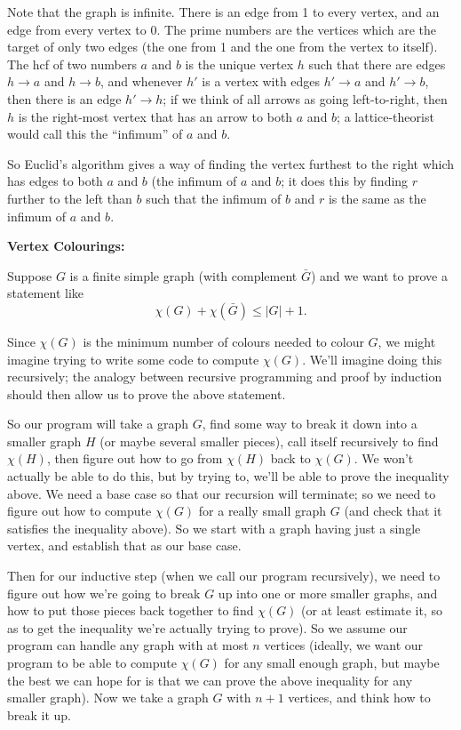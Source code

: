 \documentclass{article}
\begin{document}
Note that the graph is infinite. There is an edge from 1 to every vertex, and an edge from every vertex to 0. The prime numbers are the vertices which are the target of only two edges (the one from 1 and the one from the vertex to itself). The hcf of two numbers $a$ and $b$ is the unique vertex $h$ such that there are edges $h\to a$ and $h\to b$, and whenever $h'$ is a vertex with edges $h'\to a$ and $h'\to b$, then there is an edge $h'\to h$; if we think of all arrows as going left-to-right, then $h$ is the right-most vertex that has an arrow to both $a$ and $b$; a lattice-theorist would call this the ``infimum'' of $a$ and $b$.

So Euclid's algorithm gives a way of finding the vertex furthest to the right which has edges to both $a$ and $b$ (the infimum of $a$ and $b$; it does this by finding $r$ further to the left than $b$ such that the infimum of $b$ and $r$ is the same as the infimum of $a$ and $b$.

\clearpage




\textbf{Vertex Colourings:}\bigskip


Suppose $G$ is a finite simple graph (with complement $\bar{G}$) and we want to prove a statement like
\[\chi(G)+\chi(\bar{G})\leq |G|+1.\]

Since $\chi(G)$ is the minimum number of colours needed to colour $G$, we might imagine trying to write some code to compute $\chi(G)$. We'll imagine doing this recursively; the analogy between recursive programming and proof by induction should then allow us to prove the above statement.

So our program will take a graph $G$, find some way to break it down into a smaller graph $H$ (or maybe several smaller pieces), call itself recursively to find $\chi(H)$, then figure out how to go from $\chi(H)$ back to $\chi(G)$. We won't actually be able to do this, but by trying to, we'll be able to prove the inequality above. We need a base case so that our recursion will terminate; so we need to figure out how to compute $\chi(G)$ for a really small graph $G$ (and check that it satisfies the inequality above). So we start with a graph having just a single vertex, and establish that as our base case.\medskip

Then for our inductive step (when we call our program recursively), we need to figure out how we're going to break $G$ up into one or more smaller graphs, and how to put those pieces back together to find $\chi(G)$ (or at least estimate it, so as to get the inequality we're actually trying to prove). So we assume our program can handle any graph with at most $n$ vertices (ideally, we want our program to be able to compute $\chi(G)$ for any small enough graph, but maybe the best we can hope for is that we can prove the above inequality for any smaller graph). Now we take a graph $G$ with $n+1$ vertices, and think how to break it up.
\end{document}
